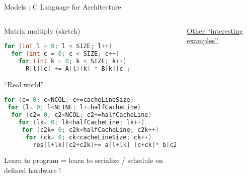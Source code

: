 \begin{frame}[fragile]{Models : C Language for Architecture}
  \begin{columns}[t]
    \begin{column}{\BW}
      \begin{block}{Matrix multiply (sketch)}\tiny
        \begin{lstlisting}[language=C,basicstyle=\tiny]
for (int l = 0; l < SIZE; l++)
  for (int c = 0; c < SIZE; c++)
    for (int k = 0; k < SIZE; k++)
      R[l][c] += A[l][k] * B[k][c];
        \end{lstlisting}
    \end{block}
   \begin{alertblock}{``Real world''}\tiny
        \begin{lstlisting}[language=C,basicstyle=\tiny]
for (c= 0; c<NCOL; c+=cacheLineSize)
 for (l= 0; l<NLINE; l+=halfCacheLine)
  for (c2= 0; c2<NCOL; c2+=halfCacheLine)
    for (lk= 0; lk<halfCacheLine; lk++)
     for (c2k= 0; c2k<halfCacheLine; c2k++)
      for (ck= 0; ck<cacheLineSize; ck++)
        res[l+lk][c2+c2k]+=	a[l+lk]	[c+ck]*	b[c2+c2k][c+ck];
    \end{lstlisting}
    \end{alertblock}
    Learn to program = learn to serialize / schedule on defined hardware !
   \end{column}
   \begin{column}{\BW}
     \begin{block}{}
     \end{block}
\href{https://hpcharles.wordpress.com/interesting-code-examples/}{Other
``interesting examples''}
   \end{column}
  \end{columns}
\end{frame}

